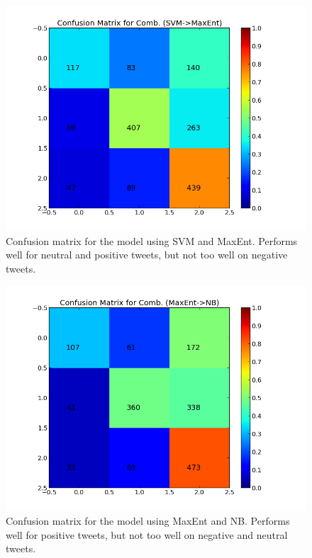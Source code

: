  \begin{minipage}[t!]{\linewidth}
      \centering
     \begin{minipage}{0.45\linewidth}
          \begin{figure}[H]
               \includegraphics[width=\linewidth]{../img/plots/grid/confusion_matrix_Comb-SVM-MaxEnt.png}
           \caption[The confusion matrix for two-step SVM -> MaxEnt]{Confusion matrix for the model using SVM and MaxEnt. Performs well for neutral and positive tweets, but not too well on negative tweets.}
           \label{fig:confmat_svm_maxent}
          \end{figure}
     \end{minipage}
     \hspace{0.05\linewidth}
     \begin{minipage}{0.45\linewidth}
          \begin{figure}[H]
               \includegraphics[width=\linewidth]{../img/plots/grid/confusion_matrix_Comb-MaxEnt-NB.png}
           \caption[The confusion matrix for two-step MaxEnt -> NB]{Confusion matrix for the model using MaxEnt and NB. Performs well for positive tweets, but not too well on negative and neutral tweets.}
           \label{fig:confmat_maxent_nb}
          \end{figure}
     \end{minipage}
\end{minipage}
     
